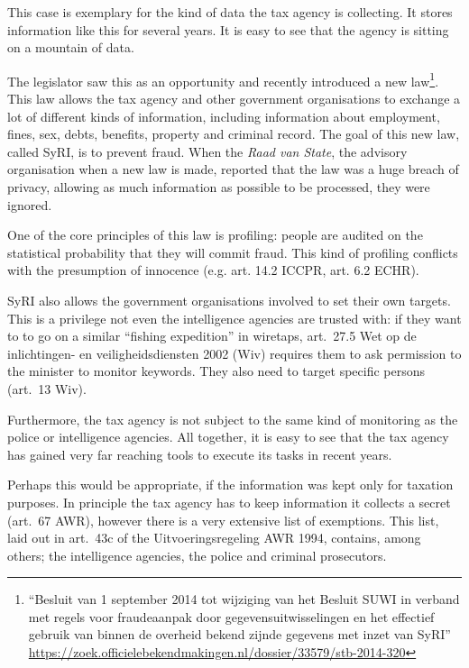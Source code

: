 \documentclass{article}
\begin{document}
This case is exemplary for the kind of data the tax agency is collecting. It
stores information like this for several years. It is easy to see that the
agency is sitting on a mountain of data.

The legislator saw this as an opportunity and recently introduced a new
law\footnote{``Besluit van 1 september 2014 tot wijziging van het Besluit SUWI
in verband met regels voor fraudeaanpak door gegevensuitwisselingen en het
effectief gebruik van binnen de overheid bekend zijnde gegevens met inzet
van SyRI''
\url{https://zoek.officielebekendmakingen.nl/dossier/33579/stb-2014-320}}.
This law allows the tax agency and other government organisations to
exchange a lot of different kinds of information, including information
about employment, fines, sex, debts, benefits, property and criminal record.
The goal of this new law, called SyRI, is to prevent fraud. When the
\emph{Raad van State}, the advisory organisation when a new law is made,
reported that the law was a huge breach of privacy, allowing as much
information as possible to be processed, they were ignored.

One of the core principles of this law is profiling: people are audited on the
statistical probability that they will commit fraud. This kind of profiling
conflicts with the presumption of innocence (e.g. art. 14.2 ICCPR, art. 6.2
ECHR).

SyRI also allows the government organisations involved to set their own targets.
This is a privilege not even the intelligence agencies are trusted with: if they
want to to go on a similar ``fishing expedition'' in wiretaps, art.~27.5 Wet op
de inlichtingen- en veiligheidsdiensten 2002 (Wiv) requires them to ask
permission to the minister to monitor keywords. They also need to target
specific persons (art.~13 Wiv).

Furthermore, the tax agency is not subject to the same kind of monitoring as the
police or intelligence agencies. All together, it is easy to see that the tax
agency has gained very far reaching tools to execute its tasks in recent years.

Perhaps this would be appropriate, if the information was kept only for taxation
purposes. In principle the tax agency has to keep information it collects
a secret (art.~67 AWR), however there is a very extensive list of exemptions.
This list, laid out in art.~43c of the Uitvoeringsregeling AWR 1994, contains,
among others; the intelligence agencies, the police and criminal prosecutors.
\end{document}
